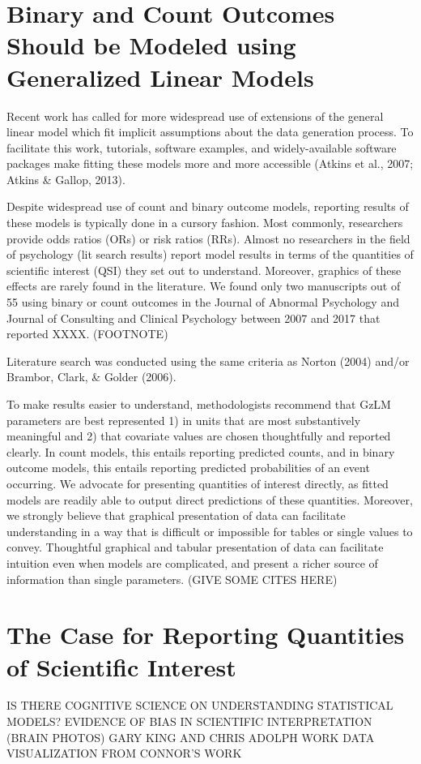 \documentclass[jou, apacite]{apa6}
\begin{document}
\section{Binary and Count Outcomes Should be Modeled using Generalized Linear Models}

Recent work has called for more widespread use of extensions of the general linear model which fit implicit assumptions about the data generation process. 
To facilitate this work, tutorials, software examples, and widely-available software packages make fitting these models more and more accessible (Atkins et al., 2007; Atkins \& Gallop, 2013). 

Despite widespread use of count and binary outcome models, reporting results of these models is typically done in a cursory fashion. 
Most commonly, researchers provide odds ratios (ORs) or risk ratios (RRs).
Almost no researchers in the field of psychology (lit search results) report model results in terms of the quantities of scientific interest (QSI) they set out to understand.
Moreover, graphics of these effects are rarely found in the literature. 
We found only two manuscripts out of 55 using binary or count outcomes in the Journal of Abnormal Psychology and Journal of Consulting and Clinical Psychology between 2007 and 2017 that reported XXXX. (FOOTNOTE) 

Literature search was conducted using the same criteria as Norton (2004) and/or Brambor, Clark, \& Golder (2006). 

To make results easier to understand, methodologists recommend that GzLM parameters are best represented 1) in units that are most substantively meaningful and 2) that covariate values are chosen thoughtfully and reported clearly.
In count models, this entails reporting predicted counts, and in binary outcome models, this entails reporting predicted probabilities of an event occurring. 
We advocate for presenting quantities of interest directly, as fitted models are readily able to output direct predictions of these quantities. 
Moreover, we strongly believe that graphical presentation of data can facilitate understanding in a way that is difficult or impossible for tables or single values to convey.
Thoughtful graphical and tabular presentation of data can facilitate intuition even when models are complicated, and present a richer source of information than single parameters. (GIVE SOME CITES HERE)

\section{The Case for Reporting Quantities of Scientific Interest}
IS THERE COGNITIVE SCIENCE ON UNDERSTANDING STATISTICAL MODELS?
EVIDENCE OF BIAS IN SCIENTIFIC INTERPRETATION (BRAIN PHOTOS)
GARY KING AND CHRIS ADOLPH WORK
DATA VISUALIZATION FROM CONNOR'S WORK
\end{document}
